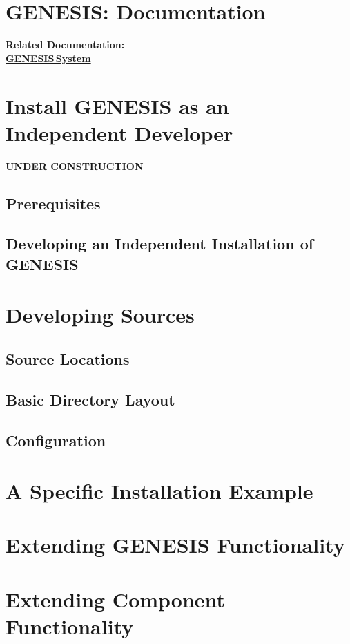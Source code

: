 \documentclass[12pt]{article}
\begin{document}
\section*{GENESIS: Documentation}

{\bf Related Documentation:} \\
\href{../genesis-system/genesis-system.tex}{\bf GENESIS\,System}

\section*{Install GENESIS as an Independent Developer}

{\bf UNDER CONSTRUCTION}

\subsection*{Prerequisites}

\subsection*{Developing an Independent Installation of GENESIS}

\section*{Developing Sources}

\subsection*{Source Locations}

\subsection*{Basic Directory Layout}

\subsection*{Configuration}

\section*{A Specific Installation Example}

\section*{Extending GENESIS Functionality}

\section*{Extending Component Functionality}
\end{document}
